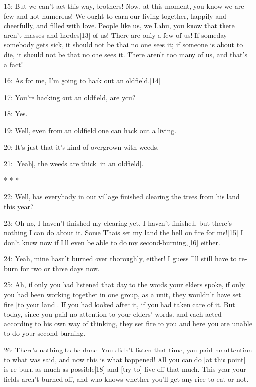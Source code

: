 {\large{}15: But we can't act this way, brothers! Now, at this moment, you know
we are few and not numerous! We ought to earn our living together, happily and
cheerfully, and filled with love. People like us, we Lahu, you know that there
aren't masses and hordes[13] of us! There are only a few of us! If someday somebody
gets sick, it should not be that no one sees it; if someone is about to die, it
should not be that no one sees it. There aren't too many of us, and that's a fact!
}

{\large{}16: As for me, I'm going to hack out an oldfield.[14]}

{\large{}17: You're hacking out an oldfield, are you?}

{\large{}18: Yes.}

{\large{}19: Well, even from an oldfield one can hack out a living. }

{\large{}20: It's just that it's kind of overgrown with weeds.}

{\large{}21: [Yeah], the weeds are thick [in an oldfield].}

\begin{center}
{\large{}* * *}
\end{center}

\leftskip=0pt
{\large{}22: Well, has everybody in our village finished clearing the trees from
his land this year? }

{\large{}23: Oh no, I haven't finished my clearing yet. I haven't finished, but
there's nothing I can do about it. Some Thais set my land the hell on fire for
me![15] I don't know now if I'll even be able to do my second-burning,[16] either.}

{\large{}24: Yeah, mine hasn't burned over thoroughly, either! I guess I'll still
have to re-burn for two or three days now. }

{\large{}25: Ah, if only you had listened that day to the words your elders spoke,
if only you had been working together in one group, as a unit, they wouldn't have
set fire [to your land]. If you had looked after it, if you had taken care of it.
But today, since you paid no attention to your elders' words, and each acted according
to his own way of thinking, they set fire to you and here you are unable to do
your second-burning. }

{\large{}26: There's nothing to be done. You didn't listen that time, you paid
no attention to what was said, and now this is what happened! All you can do [at
this point] is re-burn as much as possible[18] and [try to] live off that much.
This year your fields aren't burned off, and who knows whether you'll get any rice
to eat or not. }

